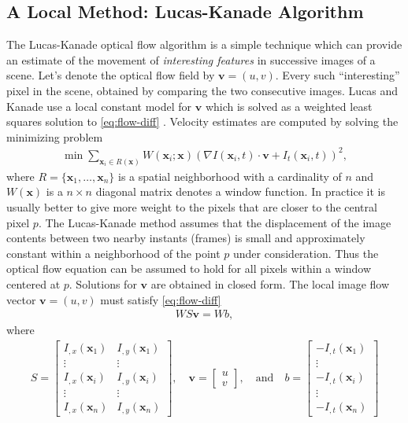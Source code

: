 \documentclass[letterpaper,11pt]{article}
\begin{document}
\subsection{A Local Method: Lucas-Kanade Algorithm}
\label{sec:Lucas-Kanade}
The Lucas-Kanade optical flow algorithm is a simple technique which can provide an estimate of the movement of \emph{interesting features} in successive
images of a scene. Let's denote the optical flow field by $\mathbf{v} = (u, v)$. Every such ``interesting'' pixel in the scene, obtained by comparing the two consecutive images. Lucas and Kanade use a local constant model for $\mathbf{v} $ which
is solved as a weighted least squares solution to \eqref{eq:flow-diff} \citep{Lucas:Kanade:1981}. Velocity estimates are
computed by solving the minimizing problem
\begin{align}
\min \sum_{\mathbf{x}_i \in R(\mathbf{x})}W(\mathbf{x}_i;\mathbf{x})(\nabla I(\mathbf{x}_i,t) \cdot \mathbf{v} + I_t(\mathbf{x}_i,t))^2,
\label{eq:lucas:canade:optim}
\end{align}
where $R = \{ \mathbf{x}_1,\dots,\mathbf{x}_n \}$ is a spatial neighborhood with a cardinality of $n$ and $W(\mathbf{x})$ is a $n \times n$ diagonal matrix denotes a window function.  In practice it is usually better to give more weight to the pixels that are closer to the central pixel $p$. The Lucas-Kanade method assumes that the displacement of the image contents between two nearby instants (frames) is small and approximately constant within a neighborhood of the point $p$ under consideration. Thus the optical flow equation can be assumed to hold for all pixels within a window centered at $p$. Solutions for $\mathbf{v}$ are obtained in closed form. The local image flow vector $\mathbf{v} = (u,v)$ must satisfy \eqref{eq:flow-diff}
\begin{align}
W S \mathbf{v} = W b,
\label{eq:lucal-kanade-matrix}
\end{align}
where
\begin{align}
S = \begin{bmatrix}
I_{,x}(\mathbf{x}_1) & I_{,y}(\mathbf{x}_1)\\
\vdots & \vdots\\
I_{,x}(\mathbf{x}_i) & I_{,y}(\mathbf{x}_i) \\
\vdots & \vdots\\
I_{,x}(\mathbf{x}_n) & I_{,y}(\mathbf{x}_n) 
\end{bmatrix},  \quad \mathbf{v} = \begin{bmatrix}
u \\
v
\end{bmatrix}, \quad \textrm{and} \quad b = \begin{bmatrix}
-I_{,t}(\mathbf{x}_1) \\
\vdots \\
-I_{,t}(\mathbf{x}_i) \\
\vdots \\
-I_{,t}(\mathbf{x}_n) 
\end{bmatrix}
\end{align} 
\end{document}
